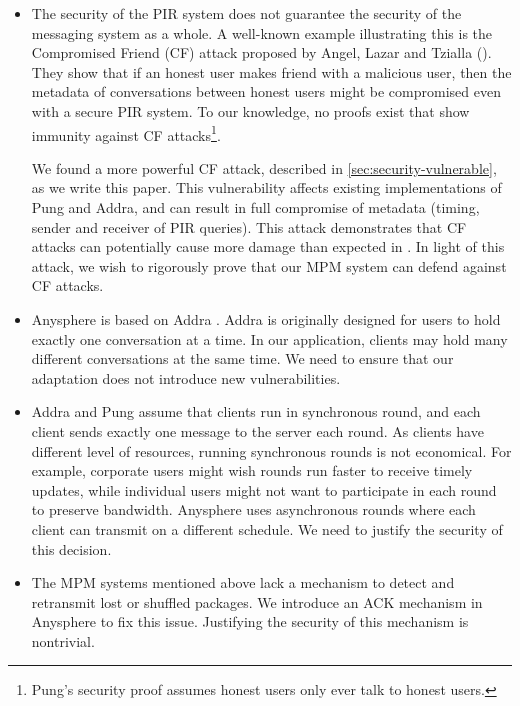 \begin{itemize}
    \item The security of the PIR system does not guarantee the security of the messaging system as a whole. A well-known example illustrating this is the Compromised Friend (CF) attack proposed by Angel, Lazar and Tzialla (\cite{angel2018cf}). They show that if an honest user makes friend with a malicious user, then the metadata of conversations between honest users might be compromised even with a secure PIR system. To our knowledge, no proofs exist that show immunity against CF attacks\footnote{Pung's security proof \cite{angel2018thesis} assumes honest users only ever talk to honest users.}. 
    
    We found a more powerful CF attack, described in \cref{sec:security-vulnerable}, as we write this paper. This vulnerability affects existing implementations of Pung and Addra, and can result in full compromise of metadata (timing, sender and receiver of PIR queries). This attack demonstrates that CF attacks can potentially cause more damage than expected in \cite{angel2018cf}. In light of this attack, we wish to rigorously prove that our MPM system can defend against CF attacks.
    
    \item Anysphere is based on Addra \cite{ahmad2021addra}. Addra is originally designed for users to hold exactly one conversation at a time. In our application, clients may hold many different conversations at the same time. We need to ensure that our adaptation does not introduce new vulnerabilities.
    
    \item Addra and Pung \cite{angel2016unobservable} assume that clients run in synchronous round, and each client sends exactly one message to the server each round. As clients have different level of resources, running synchronous rounds is not economical. For example, corporate users might wish rounds run faster to receive timely updates, while individual users might not want to participate in each round to preserve bandwidth. Anysphere uses asynchronous rounds where each client can transmit on a different schedule. We need to justify the security of this decision.
    
    \item The MPM systems mentioned above lack a mechanism to detect and retransmit lost or shuffled packages. We introduce an ACK mechanism in Anysphere to fix this issue. Justifying the security of this mechanism is nontrivial.
\end{itemize}

